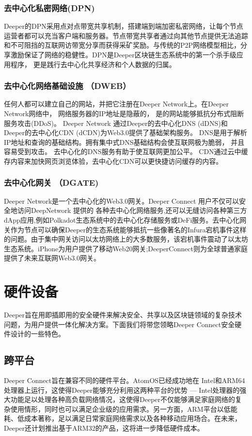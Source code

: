 \documentclass[a4paper]{article}
\begin{document}
\subsubsection{去中心化私密网络(DPN)}
Deeper的DPN采用点对点带宽共享机制，搭建端到端加密私密网络，让每个节点运营者都可以充当客户端和服务器。节点带宽共享者通过向其他节点提供无法追踪和不可阻挡的互联网访带宽分享而获得采矿奖励。与传统的P2P网络模型相比，分享激励保证了网络的稳健性。DPN是Deeper区块链生态系统中的第一个杀手级应用程序， 更是践行去中心化共享经济和个人数据的归属。


\subsubsection{去中心化网络基础设施 （DWEB）}
任何人都可以建立自己的网站，并把它注册在Deeper Network上。在Deeper Network网络中， 网络服务器的IP地址是隐蔽的， 是的网站能够抵抗分布式阻断服务攻击(DDoS)。 Deeper Network 通过Deeper的去中心化DNS (dDNS)和Deeper的去中心化CDN (dCDN)为Web3.0提供了基础架构服务。 DNS是用于解析IP地址和查询的基础结构。拥有集中式DNS基础结构会使互联网极为脆弱， 并且容易受到攻击。 去中心化的DNS服务有助于使互联网更加公平。 CDN通过云中缓存内容来加快网页浏览体验，去中心化CDN可以更快捷访问缓存的内容。

\subsubsection{去中心化网关 （DGATE)}
Deeper Network是一个去中心化的Web3.0网关。Deeper Connect 用户不仅可以安全地访问DeepNetwork 提供的
各种去中心化网络服务,还可以无缝访问各种第三方dApp应用,例如Polkadot生态系统中的去中心化存储服务或DeFi服务。去中心化网关作为节点可以确保Deeper的生态系统能够抵抗一些像著名的Infura宕机事件这样的问题。由于集中网关访问以太坊网络上的大多数服务，该宕机事件震动了以太坊生态系统。iPhone为用户提供了移动Web20网关;DeeperConnect则为全球普通家庭提供了未来互联网Web3.0网关。

\newpage
\section{硬件设备}
Deeper旨在用即插即用的安全硬件来解决安全、共享以及区块链领域的复杂技术问题，为用户提供一体化解决方案。下面我们将带您领略Deeper Connect安全硬件设计的一些特色。

\subsection{跨平台}
Deeper Connect旨在兼容不同的硬件平台。AtomOS已经成功地在 Intel和ARM64处理器上运行，这使得Deeper能够充分利用这两种平台的优势 --- Intel处理器的强大功能足以处理各种高负载网络情况，这使得Deeper不仅能够满足家庭网络的复杂使用情形，同时也可以满足企业级的应用需求。另一方面，ARM平台以低能耗、低成本著称，足以满足日常家庭网络需求以及各种移动应用场合。在未来，Deeper还计划推出基于ARM32的产品，这将进一步降低硬件成本。
\end{document}
